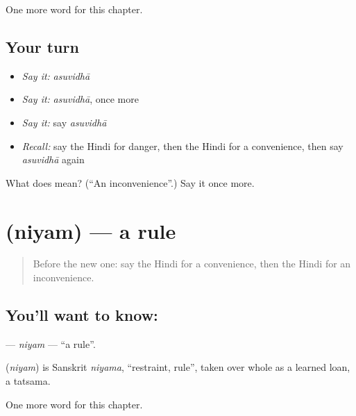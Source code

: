 \begin{grammarlens}[title={What you've built}]
One more word for this chapter.
\end{grammarlens}

\subsection*{Your turn}
\begin{itemize}
\raggedright
  \item \emph{Say it:} \emph{asuvidhā}
  \item \emph{Say it:} \emph{asuvidhā}, once more
  \item \emph{Say it:} say \emph{asuvidhā}
  \item \emph{Recall:} say the Hindi for danger, then the Hindi for a convenience, then say \emph{asuvidhā} again
\end{itemize}

\begin{tcolorbox}[breakable,colback=teal!4,colframe=teal!35!black,title={Before you move on}]
What does  mean? (\textquotedblleft{}An inconvenience\textquotedblright{}.) Say it once more.
\end{tcolorbox}
\section[\texorpdfstring{\hi{नियम} (niyam)}{नियम (niyam)}]{ (niyam) — a rule}

\label{lesson:HI-C260-niyam}



\begin{quote}
Before the new one: say the Hindi for a convenience, then the Hindi for an inconvenience.
\end{quote}

\subsection*{You'll want to know: }
\textbf{} — \emph{niyam} — \textquotedblleft{}a rule\textquotedblright{}.

\begin{cousinweb}
\textbf{} (\emph{niyam}) is Sanskrit \emph{niyama}, \textquotedblleft{}restraint, rule\textquotedblright{}, taken over whole as a learned loan, a tatsama.
\end{cousinweb}

\begin{grammarlens}[title={What you've built}]
One more word for this chapter.
\end{grammarlens}

